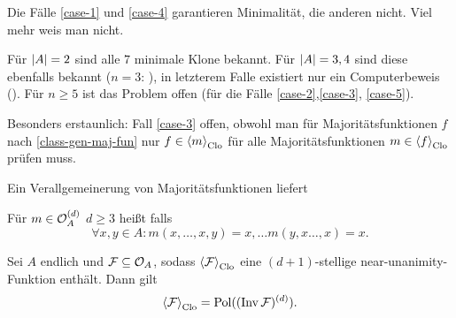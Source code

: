 \documentclass{book}
\begin{document}
\begin{remark}%
    Die Fälle \autoref{case-1} und \autoref{case-4} garantieren Minimalität, die anderen nicht. Viel mehr weis man nicht.
\end{remark}

\begin{conclusion}
    Für $\left|A\right|=2$ sind alle $7$ minimale Klone bekannt.
    Für $\left|A\right|=3,4$ sind diese ebenfalls bekannt ($n=3$: ), in letzterem Falle existiert nur ein Computerbeweis ().
    Für $n\geq 5$ ist das Problem offen (für die Fälle \autoref{case-2},\autoref{case-3}, \autoref{case-5}).%
\end{conclusion}

\begin{remark}
    Besonders erstaunlich: Fall \autoref{case-3} offen, obwohl man für Majoritätsfunktionen $f$ nach \autoref{class-gen-maj-fun} nur $f\in\gen{m}_{\Clo}$ für alle Majoritätsfunktionen $m\in\gen{f}_{\Clo}$ prüfen muss.
\end{remark}

Ein Verallgemeinerung von Majoritätsfunktionen liefert

\begin{definition}
    Für $m\in\mathcal{O}_A^{(d)}$ $d\geq 3$ heißt  falls
    $$
    \forall x,y\in A: m(x,\ldots,x,y)=x, \ldots m(y,x\ldots,x)=x.
    $$
\end{definition}

\begin{theorem}
    Sei $A$ endlich und $\mathcal{F}\subseteq \mathcal{O}_A$, sodass $\gen{\cF}_{\Clo}$ eine $(d+1)$-stellige near-unanimity-Funktion enthält. Dann gilt
    $$
    \gen{\cF}_{\Clo}=\Pol((\Inv \cF)^{(d)}).
    $$
\end{theorem}
\end{document}
